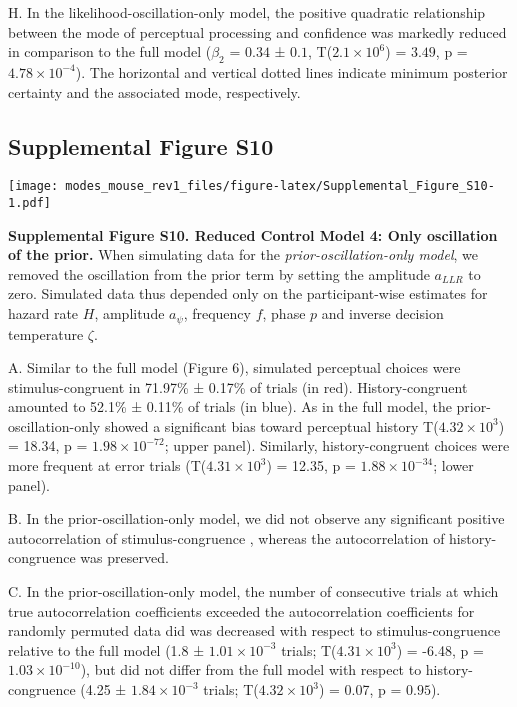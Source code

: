 \documentclass[
]{article}
\begin{document}
H. In the likelihood-oscillation-only model, the positive quadratic
relationship between the mode of perceptual processing and confidence
was markedly reduced in comparison to the full model (\(\beta_2\) =
\(0.34\) ± \(0.1\), T(\(\ensuremath{2.1\times 10^{6}}\)) = \(3.49\), p =
\(\ensuremath{4.78\times 10^{-4}}\)). The horizontal and vertical dotted
lines indicate minimum posterior certainty and the associated mode,
respectively.

\newpage

\hypertarget{supplemental-figure-s10}{%
\subsection{Supplemental Figure S10}\label{supplemental-figure-s10}}

\texttt{[image: modes\_mouse\_rev1\_files/figure-latex/Supplemental\_Figure\_S10-1.pdf]}

\textbf{Supplemental Figure S10. Reduced Control Model 4: Only
oscillation of the prior.} When simulating data for the
\emph{prior-oscillation-only model}, we removed the oscillation from the
prior term by setting the amplitude \(a_{LLR}\) to zero. Simulated data
thus depended only on the participant-wise estimates for hazard rate
\(H\), amplitude \(a_{\psi}\), frequency \(f\), phase \(p\) and inverse
decision temperature \(\zeta\).

A. Similar to the full model (Figure 6), simulated perceptual choices
were stimulus-congruent in 71.97\% ± 0.17\% of trials (in red).
History-congruent amounted to 52.1\% ± 0.11\% of trials (in blue). As in
the full model, the prior-oscillation-only showed a significant bias
toward perceptual history T(\ensuremath{4.32\times 10^{3}}) = 18.34, p =
\(\ensuremath{1.98\times 10^{-72}}\); upper panel). Similarly,
history-congruent choices were more frequent at error trials
(T(\ensuremath{4.31\times 10^{3}}) = 12.35, p =
\(\ensuremath{1.88\times 10^{-34}}\); lower panel).

B. In the prior-oscillation-only model, we did not observe any
significant positive autocorrelation of stimulus-congruence , whereas
the autocorrelation of history-congruence was preserved.

C. In the prior-oscillation-only model, the number of consecutive trials
at which true autocorrelation coefficients exceeded the autocorrelation
coefficients for randomly permuted data did was decreased with respect
to stimulus-congruence relative to the full model (1.8 ±
\ensuremath{1.01\times 10^{-3}} trials;
T(\ensuremath{4.31\times 10^{3}}) = -6.48, p =
\(\ensuremath{1.03\times 10^{-10}}\)), but did not differ from the full
model with respect to history-congruence (4.25 ±
\ensuremath{1.84\times 10^{-3}} trials;
T(\ensuremath{4.32\times 10^{3}}) = 0.07, p = \(0.95\)).
\end{document}
